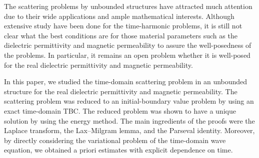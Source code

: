 \documentclass[11pt,reqno]{amsart}
\numberwithin{equation}{section}
\begin{document}
The scattering problems by unbounded structures have attracted much 
attention due to their wide applications and ample mathematical interests.
Although extensive study have been done for the time-harmonic problems, it is
still not clear what the best conditions are for those material parameters such
as the dielectric permittivity and magnetic permeability to assure the
well-posedness of the problems. In particular, it remains an open problem
whether it is well-posed for the real dielectric permittivity and magnetic
permeability. 

In this paper, we studied the time-domain scattering problem in an unbounded 
structure for the real dielectric permittivity and magnetic permeability. The
scattering problem was reduced to an initial-boundary value problem by using an
exact time-domain TBC. The reduced problem was shown to have a unique solution
by using the energy method. The main ingredients of the proofs were the Laplace
transform, the Lax--Milgram lemma, and the Parseval identity. Moreover, by
directly considering the variational problem of the time-domain wave equation,
we obtained a priori estimates with explicit dependence on time. 
\end{document}
